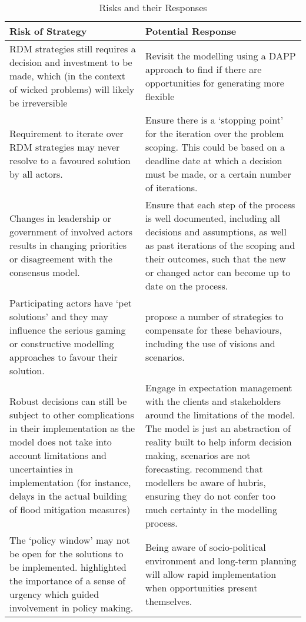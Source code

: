 \begin{table}[h!]
\caption{Risks and their Responses}
\label{tab:pr-risks-and-responses}
\centering
\begin{tabular}{p{}|p{}}
\hline
Risk of Strategy &
  Potential Response \\ \hline
RDM strategies still requires a decision and investment to be made, which (in the context of wicked problems) will likely be irreversible &
  Revisit the modelling using a DAPP approach to find if there are opportunities for generating more flexible \\ \hline
Requirement to iterate over RDM strategies may never resolve to a favoured solution by all actors. &
  Ensure there is a ‘stopping point’ for the iteration over the problem scoping. This could be based on a deadline date at which a decision must be made, or a certain number of iterations. \\ \hline
Changes in leadership or government of involved actors results in changing priorities or disagreement with the consensus model. &
  Ensure that each step of the process is well documented, including all decisions and assumptions, as well as past iterations of the scoping and their outcomes, such that the new or changed actor can become up to date on the process. \\ \hline
Participating actors have ‘pet solutions’ and they may influence the serious gaming or constructive modelling approaches to favour their solution. &
  \citeauthor{pot_what_2018} propose a number of strategies to compensate for these behaviours, including the use of visions and scenarios. \\ \hline
Robust decisions can still be subject to other complications in their implementation as the model does not take into account limitations and uncertainties in implementation (for instance, delays in the actual building of flood mitigation measures) &
  Engage in expectation management with the clients and stakeholders around the limitations of the model. The model is just an abstraction of reality built to help inform decision making, scenarios are not forecasting. \cite{saltelli_five_2020} recommend that modellers be aware of hubris, ensuring they do not confer too much certainty in the modelling process. \\ \hline
The ‘policy window’ may not be open for the solutions to be implemented. \cite{rijke_room_2012} highlighted the importance of a sense of urgency which guided involvement in policy making. & Being aware of socio-political environment and long-term planning will allow rapid implementation when opportunities present themselves.

\end{tabular}
\end{table}
